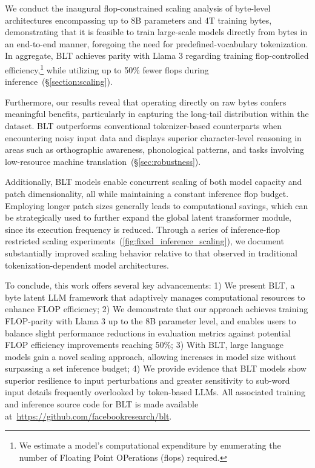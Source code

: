 We conduct the inaugural flop-constrained scaling analysis of byte-level architectures encompassing up to 8B parameters and 4T training bytes, demonstrating that it is feasible to train large-scale models directly from bytes in an end-to-end manner, foregoing the need for predefined-vocabulary tokenization. In aggregate, {\textsc BLT} achieves parity with Llama 3 regarding training flop-controlled efficiency,\footnote{We estimate a model's computational expenditure by enumerating the number of Floating Point OPerations (flops) required.} while utilizing up to 50\% fewer flops during inference~(\S\ref{section:scaling}). 

Furthermore, our results reveal that operating directly on raw bytes confers meaningful benefits, particularly in capturing the long-tail distribution within the dataset. {\textsc BLT} outperforms conventional tokenizer-based counterparts when encountering noisy input data and displays superior character-level reasoning in areas such as orthographic awareness, phonological patterns, and tasks involving low-resource machine translation~(\S\ref{sec:robustness}).

Additionally, {\textsc BLT} models enable concurrent scaling of both model capacity and patch dimensionality, all while maintaining a constant inference flop budget. Employing longer patch sizes generally leads to computational savings, which can be strategically used to further expand the global latent transformer module, since its execution frequency is reduced. Through a series of inference-flop restricted scaling experiments~(\autoref{fig:fixed_inference_scaling}), we document substantially improved scaling behavior relative to that observed in traditional tokenization-dependent model architectures.

To conclude, this work offers several key advancements: 1) We present {\textsc BLT}, a byte latent LLM framework that adaptively manages computational resources to enhance FLOP efficiency; 2) We demonstrate that our approach achieves training FLOP-parity with Llama 3 up to the 8B parameter level, and enables users to balance slight performance reductions in evaluation metrics against potential FLOP efficiency improvements reaching 50\%; 3) With {\textsc BLT}, large language models gain a novel scaling approach, allowing increases in model size without surpassing a set inference budget; 4) We provide evidence that {\textsc BLT} models show superior resilience to input perturbations and greater sensitivity to sub-word input details frequently overlooked by token-based LLMs. All associated training and inference source code for {\textsc BLT} is made available at~\url{https://github.com/facebookresearch/blt}.

